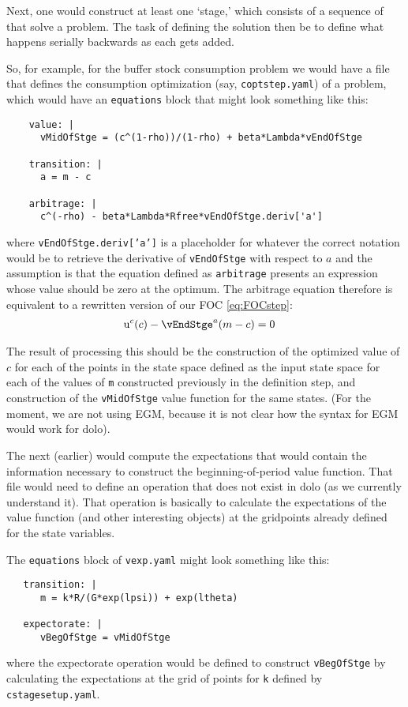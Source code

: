 \documentclass[SolvingMicroDSOPs]{subfiles}
\begin{document}
Next, one would construct at least one `stage,' which consists of a sequence of {\moves} that solve a problem.  The task of defining the solution then be to define what happens serially backwards as each {\move} gets added.

So, for example, for the buffer stock consumption problem we would have a file that defines the consumption optimization {\move} (say, \texttt{coptstep.yaml}) of a problem, which would have an \texttt{equations} block that might look something like this:

\begin{verbatim}
    value: |
      vMidOfStge = (c^(1-rho))/(1-rho) + beta*Lambda*vEndOfStge

    transition: |
      a = m - c

    arbitrage: |
      c^(-rho) - beta*Lambda*Rfree*vEndOfStge.deriv['a'] 

\end{verbatim}
where \texttt{vEndOfStge.deriv['a']} is a placeholder for whatever the correct notation would be to retrieve the derivative of \texttt{vEndOfStge} with respect to $a$ and the assumption is that the equation defined as \texttt{arbitrage} presents an expression whose value should be zero at the optimum.  The arbitrage equation therefore is equivalent to a rewritten version of our FOC \eqref{eq:FOCstep}:
\begin{align}
  \uFunc^{{c}}(c) - \vEndStge^{{a}}(m-c) & = 0
\end{align}

The result of processing this {\move} should be the construction of the optimized value of $c$ for each of the points in the state space defined as the input state space for each of the values of \texttt{m} constructed previously in the definition step, and construction of the \texttt{vMidOfStge} value function for the same states. (For the moment, we are not using EGM, because it is not clear how the syntax for EGM would work for dolo).

The next (earlier) {\move} would compute the expectations that would contain the information necessary to construct the beginning-of-period value function.  That file would need to define an operation that does not exist in dolo (as we currently understand it).  That operation is basically to calculate the expectations of the value function (and other interesting objects) at the gridpoints already defined for the state variables.

The \texttt{equations} block of \texttt{vexp.yaml} might look something like this:
\begin{verbatim}
   transition: |
      m = k*R/(G*exp(lpsi)) + exp(ltheta)

   expectorate: |
      vBegOfStge = vMidOfStge

\end{verbatim}
where the expectorate operation would be defined to construct \texttt{vBegOfStge} by calculating the expectations at the grid of points for \texttt{k} defined by \texttt{cstagesetup.yaml}.  
\end{document}
